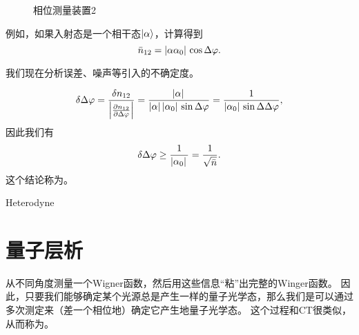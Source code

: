 \begin{figure}
    
    \caption{相位测量装置2}
\end{figure}

例如，如果入射态是一个相干态$\ket{\alpha}$，计算得到
\begin{equation}
    \bar{n}_{12} = \abs*{\alpha \alpha_0} \cos \Delta \varphi.
\end{equation}

我们现在分析误差、噪声等引入的不确定度。

\begin{equation}
    \var{\Delta\varphi} = \frac{\var{n_{12}}}{\abs{\pdv{n_{12}}{\Delta\varphi}}} = \frac{\abs*{\alpha}}{\abs*{\alpha} \abs*{\alpha_0} \sin \Delta \varphi} = \frac{1}{\abs*{\alpha_0} \sin \Delta \Delta \varphi},
\end{equation}
因此我们有
\begin{equation}
    \var{\Delta \varphi} \geq \frac{1}{\abs*{\alpha_0}} = \frac{1}{\sqrt{\bar{n}}}.
\end{equation}
这个结论称为。

Heterodyne

\section{量子层析}

从不同角度测量一个Wigner函数，然后用这些信息“粘”出完整的Winger函数。
因此，只要我们能够确定某个光源总是产生一样的量子光学态，那么我们是可以通过多次测定来（差一个相位地）确定它产生地量子光学态。
这个过程和CT很类似，从而称为。